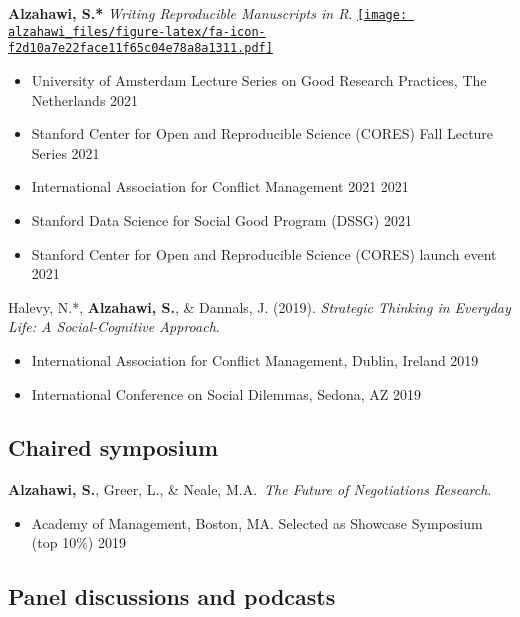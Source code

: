 \documentclass[11pt,a4paper,]{awesome-cv}
\providecommand{\tightlist}{%
	\setlength{\itemsep}{0pt}\setlength{\parskip}{0pt}}
\begin{document}
\textbf{Alzahawi, S.*} \emph{Writing Reproducible Manuscripts in R}.
\href{https://shilaan.rbind.io/talks/reporting/}{\texttt{[image: alzahawi\_files/figure-latex/fa-icon-f2d10a7e22face11f65c04e78a8a1311.pdf]}}

\begin{itemize}
\tightlist
\item
  University of Amsterdam Lecture Series on Good Research Practices, The
  Netherlands \hfill 2021
\item
  Stanford Center for Open and Reproducible Science (CORES) Fall Lecture
  Series \hfill 2021
\item
  International Association for Conflict Management 2021 \hfill 2021
\item
  Stanford Data Science for Social Good Program (DSSG) \hfill 2021
\item
  Stanford Center for Open and Reproducible Science (CORES) launch event
  \hfill 2021
\end{itemize}

Halevy, N.*, \textbf{Alzahawi, S.}, \& Dannals, J. (2019).
\emph{Strategic Thinking in Everyday Life: A Social-Cognitive Approach}.

\begin{itemize}
\tightlist
\item
  International Association for Conflict Management, Dublin, Ireland
  \hfill 2019
\item
  International Conference on Social Dilemmas, Sedona, AZ \hfill 2019
\end{itemize}

\hypertarget{chaired-symposium}{%
\subsection{Chaired symposium}\label{chaired-symposium}}

\textbf{Alzahawi, S.}, Greer, L., \& Neale, M.A.~\emph{The Future of
Negotiations Research}.

\begin{itemize}
\tightlist
\item
  Academy of Management, Boston, MA. Selected as Showcase Symposium (top
  10\%) \hfill 2019
\end{itemize}

\hypertarget{panel-discussions-and-podcasts}{%
\subsection{Panel discussions and
podcasts}\label{panel-discussions-and-podcasts}}
\end{document}
